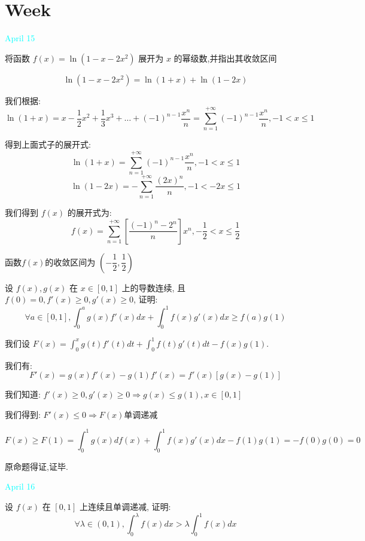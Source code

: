 \section{Week }
\textcolor{cyan}{April 15}

\begin{example}[][Exam: 30.3.1]
	将函数 $f(x)=\ln(1-x-2x^2)$ 展开为 $x$ 的幂级数,并指出其收敛区间
\end{example}

\begin{solution}
	$$\ln(1-x-2x^2)=\ln(1+x)+\ln(1-2x)$$
	
	我们根据: 
	$$\ln(1+x)=x-\frac{1}{2}x^2+\frac{1}{3}x^3+\dots+(-1)^{n-1}\frac{x^n}{n}=\sum\limits_{n=1}^{+\infty}(-1)^{n-1}\frac{x^n}{n},-1<x\leq 1$$
	
	得到上面式子的展开式: 
	$$\ln(1+x)=\sum\limits_{n=1}^{+\infty}(-1)^{n-1}\frac{x^n}{n},-1<x\leq 1$$
	$$\ln(1-2x)=-\sum\limits_{n=1}^{+\infty}\frac{(2x)^n}{n},-1<-2x\leq 1$$
	
	我们得到 $f(x)$ 的展开式为: 
	$$f(x)=\sum\limits_{n=1}^{+\infty}[\frac{(-1)^n-2^n}{n}]x^n,-\frac{1}{2}<x\leq \frac{1}{2}$$
	
	函数$f(x)$的收敛区间为 $(-\dfrac{1}{2},\dfrac{1}{2})$
\end{solution}

\begin{example}[][Exam: 30.3.2]
	设 $f(x), g(x)$ 在 $x\in[0,1]$ 上的导数连续, 且 $f(0)=0,f'(x)\geq 0,g'(x)\geq 0$, 证明: 
	$$\forall a\in[0,1], \int_{0}^{a}g(x)f'(x)dx+\int_{0}^{1}f(x)g'(x)dx\geq f(a)g(1)$$
\end{example}

\begin{solution}
	
	我们设 $F(x)=\int_{0}^{x}g(t)f'(t)dt+\int_{0}^{1}f(t)g'(t)dt-f(x)g(1)$.
	
	我们有: $$F'(x)=g(x)f'(x)-g(1)f'(x)=f'(x)[g(x)-g(1)]$$
	
	我们知道: $f'(x)\geq 0,g'(x)\geq 0\Rightarrow g(x)\leq g(1),x\in[0,1]$
	
	我们得到: $F'(x)\leq 0\Rightarrow F(x)\text{单调递减}$
	
	$$F(x)\geq F(1)=\int_{0}^{1}g(x)df(x)+\int_{0}^{1}f(x)g'(x)dx-f(1)g(1)=-f(0)g(0)=0$$
	
	原命题得证,证毕.
\end{solution}

\textcolor{cyan}{April 16}

\begin{example}[][Exam: 30.3.3]
	设 $f(x)$ 在 $[0,1]$ 上连续且单调递减, 证明: 
	$$\forall \lambda\in (0,1),\int_{0}^{\lambda}f(x)dx>\lambda\int_{0}^{1}f(x)dx$$
\end{example}	


